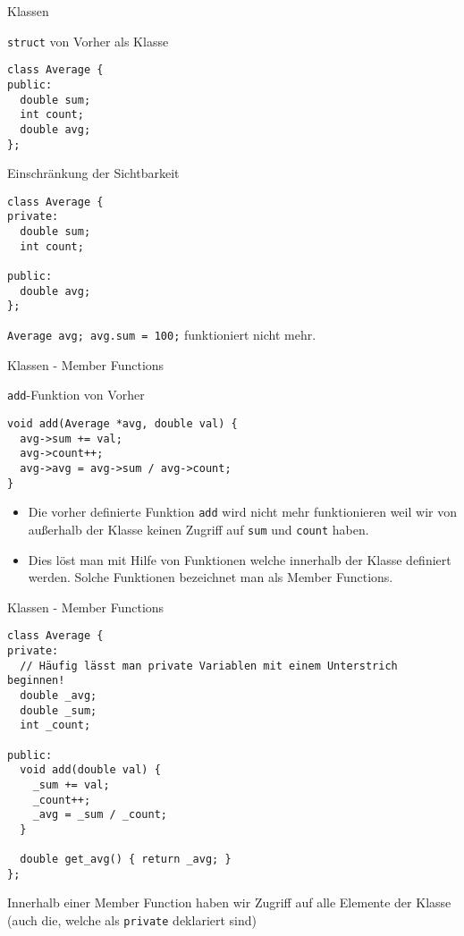 \documentclass[presentation]{beamer}
\begin{document}
\begin{frame}[label={sec:orgb95bba8},fragile]{Klassen}
 \begin{exampleblock}{{\color{solarizedYellow}\texttt{struct}} von Vorher als Klasse}
\begin{verbatim}
class Average {
public:
  double sum;
  int count;
  double avg;
};
\end{verbatim}
\end{exampleblock}
\begin{exampleblock}{Einschränkung der Sichtbarkeit}
\begin{verbatim}
class Average {
private:
  double sum;
  int count;

public:
  double avg;
};
\end{verbatim}
{\color{solarizedYellow}\verb!Average avg; avg.sum = 100;!} funktioniert nicht mehr.
\end{exampleblock}
\end{frame}
\begin{frame}[label={sec:org80731f3},fragile]{Klassen - Member Functions}
 \begin{exampleblock}{{\color{solarizedYellow}\texttt{add}}-Funktion von Vorher}
\begin{verbatim}
void add(Average *avg, double val) {
  avg->sum += val;
  avg->count++;
  avg->avg = avg->sum / avg->count;
}
\end{verbatim}
\end{exampleblock}
\begin{itemize}
\item Die vorher definierte Funktion {\color{solarizedYellow}\verb!add!} wird nicht mehr funktionieren
weil wir von außerhalb der Klasse keinen Zugriff auf {\color{solarizedYellow}\verb!sum!} und
{\color{solarizedYellow}\verb!count!} haben.

\item Dies löst man mit Hilfe von Funktionen welche innerhalb der Klasse
definiert werden. Solche Funktionen bezeichnet man als \alert{Member
Functions}.
\end{itemize}
\end{frame}
\begin{frame}[label={sec:org86ac9ee},fragile]{Klassen - Member Functions}
 \begin{verbatim}
class Average {
private:
  // Häufig lässt man private Variablen mit einem Unterstrich beginnen!
  double _avg;
  double _sum;
  int _count;

public:
  void add(double val) {
    _sum += val;
    _count++;
    _avg = _sum / _count;
  }

  double get_avg() { return _avg; }
};
\end{verbatim}
Innerhalb einer Member Function haben wir Zugriff auf \alert{alle Elemente}
der Klasse (auch die, welche als {\color{solarizedYellow}\verb!private!} deklariert sind)
\end{frame}
\end{document}
